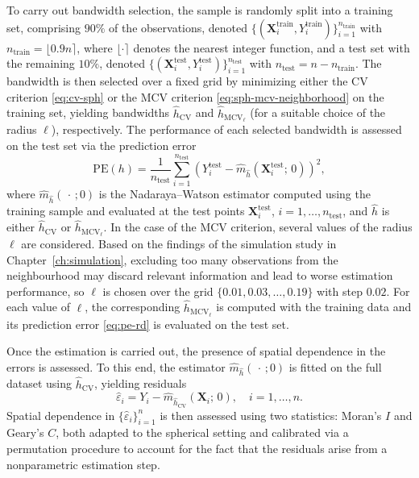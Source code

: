 \documentclass[12pt]{report} %
\newcommand{\bX}{\mathbf{X}}
\begin{document}
To carry out bandwidth selection, the sample is randomly split into a training set, comprising $90\%$ of the observations, denoted
$\{(\bX_i^{\mathrm{train}}, Y_i^{\mathrm{train}})\}_{i=1}^{n_{\mathrm{train}}}$
with $n_{\mathrm{train}} = \lfloor 0.9n \rceil$, where $\lfloor \cdot \rceil$ denotes the nearest integer function, and a test set with the remaining $10\%$, denoted $\{(\bX_i^{\mathrm{test}}, Y_i^{\mathrm{test}})\}_{i=1}^{n_{\mathrm{test}}}$ with $n_{\mathrm{test}} = n - n_{\mathrm{train}}$. The bandwidth is then
selected over a fixed grid by minimizing either the CV criterion
\eqref{eq:cv-sph} or the MCV criterion \eqref{eq:sph-mcv-neighborhood} on the training set, yielding bandwidths $\hat{h}_{\mathrm{CV}}$ and $\hat{h}_{\mathrm{MCV}_\ell}$ (for a suitable choice of the radius $\ell$), respectively. The performance of each selected bandwidth is assessed on the test set via the prediction error
\begin{equation}
    \mathrm{PE}(h) = \frac{1}{n_{\mathrm{test}}}
    \sum_{i=1}^{n_{\mathrm{test}}}
    \left( Y_i^{\mathrm{test}} - \hat{m}_{\hat{h}}(\bX_i^{\mathrm{test}};\,0)
    \right)^2,
    \label{eq:pe-rd}
\end{equation}
where $\hat{m}_{\hat{h}}(\,\cdot\,;0)$ is the Nadaraya--Watson estimator computed using the training sample and evaluated at the test points $\bX_i^{\mathrm{test}}$, $i = 1, \ldots, n_{\mathrm{test}}$, and $\hat{h}$ is either $\hat{h}_{\mathrm{CV}}$ or $\hat{h}_{\mathrm{MCV}_\ell}$. In the case of the MCV criterion, several values of the radius $\ell$ are
considered. Based on the findings of the simulation study in
Chapter~\ref{ch:simulation}, excluding too many observations from the neighbourhood may discard relevant information and lead to worse estimation performance, so $\ell$ is chosen over the grid $\{0.01, 0.03, \ldots, 0.19\}$ with step $0.02$. For each value of $\ell$, the corresponding $\hat{h}_{\mathrm{MCV}_\ell}$ is computed with the training data and its prediction error
\eqref{eq:pe-rd} is evaluated on the test set. 

Once the estimation is carried out, the presence of spatial dependence in the errors is assessed. To this end, the estimator $\hat{m}_{\hat{h}}(\,\cdot\,;0)$ is fitted on the full dataset using $\hat{h}_{\mathrm{CV}}$, yielding residuals
\begin{equation*}
    \hat{\varepsilon}_i = Y_i - \hat{m}_{\hat{h}_{\mathrm{CV}}}(\bX_i;\,0),
    \quad i = 1, \ldots, n.
\end{equation*}
Spatial dependence in $\{\hat{\varepsilon}_i\}_{i=1}^n$ is then assessed using two statistics: Moran's $I$ and Geary's $C$, both adapted to the spherical setting and calibrated via a permutation procedure to account for the fact that the residuals arise from a nonparametric estimation step.
\end{document}
